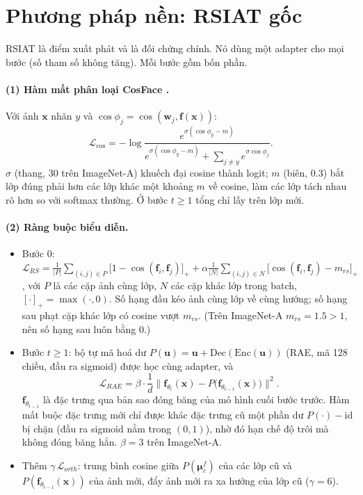 \documentclass[11pt]{article}
\newcommand{\bmu}{\boldsymbol{\mu}}
\newcommand{\vf}{\mathbf{f}}
\newcommand{\vx}{\mathbf{x}}
\newcommand{\vw}{\mathbf{w}}
\newcommand{\vu}{\mathbf{u}}
\begin{document}
\section{Phương pháp nền: RSIAT gốc}\label{sec:rsiat}
RSIAT \cite{rsiat} là điểm xuất phát và là đối chứng chính. Nó dùng một adapter cho mọi bước (số tham số không tăng).
Mỗi bước gồm bốn phần.

\paragraph{(1) Hàm mất phân loại CosFace \cite{cosface}.} Với ảnh $\vx$ nhãn $y$ và $\cos\phi_j=\cos(\vw_j,\vf(\vx))$:
\begin{equation}\label{eq:cosface}
\mathcal L_{\text{cos}}=-\log\frac{e^{\sigma(\cos\phi_y-m)}}{e^{\sigma(\cos\phi_y-m)}+\sum_{j\ne y}e^{\sigma\cos\phi_j}}.
\end{equation}
$\sigma$ (thang, 30 trên ImageNet-A) khuếch đại cosine thành logit; $m$ (biên, 0.3) bắt lớp đúng phải hơn các lớp khác
một khoảng $m$ về cosine, làm các lớp tách nhau rõ hơn so với softmax thường. Ở bước $t\ge1$ tổng chỉ lấy trên lớp mới.

\paragraph{(2) Ràng buộc biểu diễn.}
\begin{itemize}
\item Bước 0: $\mathcal L_{RS}=\frac1{|P|}\sum_{(i,j)\in P}\big[1-\cos(\vf_i,\vf_j)\big]_+ +
      \alpha\frac1{|N|}\sum_{(i,j)\in N}\big[\cos(\vf_i,\vf_j)-m_{rs}\big]_+$, với $P$ là các cặp ảnh cùng lớp, $N$ các
      cặp khác lớp trong batch, $[\cdot]_+=\max(\cdot,0)$. Số hạng đầu kéo ảnh cùng lớp về cùng hướng; số hạng sau phạt
      cặp khác lớp có cosine vượt $m_{rs}$. (Trên ImageNet-A $m_{rs}=1.5>1$, nên số hạng sau luôn bằng 0.)
\item Bước $t\ge1$: bộ tự mã hoá dư $P(\vu)=\vu+\mathrm{Dec}(\mathrm{Enc}(\vu))$ (RAE, mã 128 chiều, đầu ra sigmoid)
      được học cùng adapter, và
      \begin{equation}\label{eq:rae}
      \mathcal L_{RAE}=\beta\cdot\frac1d\big\|\vf_{\theta_t}(\vx)-P\big(\vf_{\theta_{t-1}}(\vx)\big)\big\|^2 .
      \end{equation}
      $\vf_{\theta_{t-1}}$ là đặc trưng qua bản sao đóng băng của mô hình cuối bước trước. Hàm mất buộc đặc trưng mới
      chỉ được khác đặc trưng cũ một phần dư $P(\cdot)-\mathrm{id}$ bị chặn (đầu ra sigmoid nằm trong $(0,1)$), nhờ đó
      hạn chế độ trôi mà không đóng băng hẳn. $\beta=3$ trên ImageNet-A.
\item Thêm $\gamma\,\mathcal L_{orth}$: trung bình cosine giữa $P(\bmu^f_c)$ của các lớp cũ và $P(\vf_{\theta_{t-1}}(\vx))$
      của ảnh mới, đẩy ảnh mới ra xa hướng của lớp cũ ($\gamma=6$).
\end{itemize}
\end{document}
